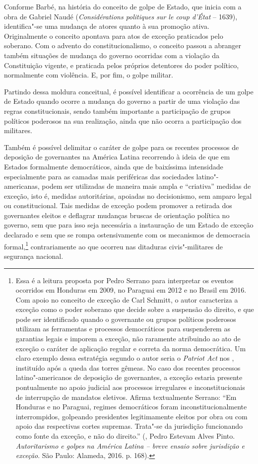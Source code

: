 Conforme Barbé, na história do conceito de golpe de Estado, que inicia
com a obra de Gabriel Naudé (\emph{Considérations politiques sur le coup
d'État} -- 1639), identifica"-se uma mudança de atores quanto à sua
promoção ativa. Originalmente o conceito apontava para atos de exceção
praticados pelo soberano. Com o advento do constitucionalismo, o
conceito passou a abranger também situações de mudança do governo
ocorridas com a violação da Constituição vigente, e praticada pelos
próprios detentores do poder político, normalmente com violência. E, por
fim, o golpe militar.

Partindo dessa moldura conceitual, é possível identificar a ocorrência
de um golpe de Estado quando ocorre a mudança do governo a partir de uma
violação das regras constitucionais, sendo também importante a
participação de grupos políticos poderosos na sua realização, ainda
que não ocorra a participação dos militares.

Também é possível delimitar o caráter de golpe para os recentes
processos de deposição de governantes na América Latina recorrendo à
ideia de que em Estados formalmente democráticos, ainda que de
baixíssima intensidade especialmente para as camadas mais periféricas
das sociedades latino"-americanas, podem ser utilizadas de maneira mais
ampla e ``criativa'' medidas de exceção, isto é, medidas autoritárias,
apoiadas no decisionismo, sem amparo legal ou constitucional. Tais
medidas de exceção podem promover a retirada dos governantes eleitos e
deflagrar mudanças bruscas de orientação política no governo, sem que
para isso seja necessária a instauração de um Estado de exceção
declarado e sem que se rompa ostensivamente com os mecanismos de
democracia formal,\footnote{Essa é a leitura proposta por Pedro Serrano
  para interpretar os eventos ocorridos em Honduras em 2009, no Paraguai
  em 2012 e no Brasil em 2016. Com apoio no conceito de exceção de Carl
  Schmitt, o autor caracteriza a exceção como o poder soberano que decide
  sobre a suspensão do direito, e que pode ser identificado quando o
  governante ou grupos políticos poderosos utilizam as ferramentas e
  processos democráticos para suspenderem as garantias legais e imporem
  a exceção, não raramente atribuindo ao ato de exceção o caráter de
  aplicação regular e correta da norma democrática. Um claro exemplo
  dessa estratégia segundo o autor seria o \emph{Patriot Act} nos ,
  instituído após a queda das torres gêmeas. No caso dos recentes
  processos latino"-americanos de deposição de governantes, a exceção
  estaria presente pontualmente no apoio judicial aos processos
  irregulares e inconstitucionais de interrupção de mandatos eletivos.
  Afirma textualmente Serrano: ``Em Honduras e no Paraguai, regimes
      democráticos foram inconstitucionalmente interrompidos, golpeando
      presidentes legitimamente eleitos por obra ou com apoio das
      respectivas cortes supremas. Trata"-se da jurisdição funcionando como
      fonte da exceção, e não do direito.'' (, Pedro Estevam Alves
  Pinto. \emph{Autoritarismo e golpes na América Latina -- breve
  ensaio sobre jurisdição e exceção}. São Paulo: Alameda, 2016. p. 168).}
contrariamente ao que ocorreu nas ditaduras civis"-militares de segurança
nacional.

